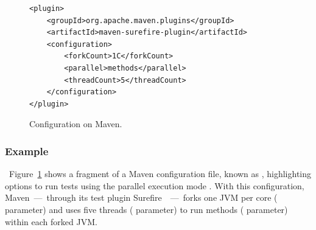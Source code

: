 



\begin{figure}[h!]
\centering
\scriptsize
{}
\begin{lstlisting}
<plugin>
    <groupId>org.apache.maven.plugins</groupId>
    <artifactId>maven-surefire-plugin</artifactId>
    <configuration>
        <forkCount>1C</forkCount>
        <parallel>methods</parallel>
        <threadCount>5</threadCount>
    </configuration>
</plugin>
\end{lstlisting}
    \caption{\label{fig:surefire} Configuration \ForkParMeth{} on Maven.}
\end{figure}

\subsubsection*{Example}~Figure~\ref{fig:surefire} shows a
fragment of a Maven configuration file, known as \pomf{}, highlighting
options to run tests using the parallel execution mode \ForkParMeth{}.
With this configuration, Maven~---~through its test plugin
Surefire~\cite{maven-surefire-plugin}~---~forks one JVM per core
( parameter) and uses five threads
( parameter) to run methods (
parameter) within each forked JVM.

